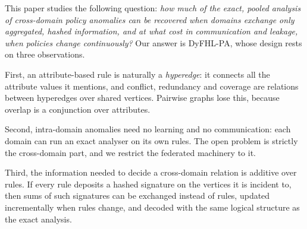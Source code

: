 \documentclass[preprint,12pt]{elsarticle}
\theoremstyle{definition}
\newcommand{\name}{DyFHL-PA\xspace}
\begin{document}
This paper studies the following question: \emph{how much of the exact, pooled analysis of cross-domain policy anomalies can be recovered when domains exchange only aggregated, hashed information, and at what cost in communication and leakage, when policies change continuously?} Our answer is \name, whose design rests on three observations.

First, an attribute-based rule is naturally a \emph{hyperedge}: it connects all the attribute values it mentions, and conflict, redundancy and coverage are relations between hyperedges over shared vertices. Pairwise graphs lose this, because overlap is a conjunction over attributes.

Second, intra-domain anomalies need no learning and no communication: each domain can run an exact analyser on its own rules. The open problem is strictly the cross-domain part, and we restrict the federated machinery to it.

Third, the information needed to decide a cross-domain relation is additive over rules. If every rule deposits a hashed signature on the vertices it is incident to, then sums of such signatures can be exchanged instead of rules, updated incrementally when rules change, and decoded with the same logical structure as the exact analysis.
\end{document}

